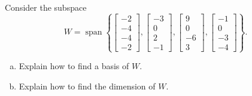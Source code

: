 
\begin{exerciseStatement}


Consider the subspace \[W=\operatorname{span}  \left\{ \left[\begin{array}{c}
-2 \\
-4 \\
-4 \\
-2
\end{array}\right] , \left[\begin{array}{c}
-3 \\
0 \\
2 \\
-1
\end{array}\right] , \left[\begin{array}{c}
9 \\
0 \\
-6 \\
3
\end{array}\right] , \left[\begin{array}{c}
-1 \\
0 \\
-3 \\
-4
\end{array}\right] \right\} .\]


\begin{enumerate}[(a)]
\item  Explain how to find a basis of \(W\).
\item  Explain how to find the dimension of \(W\).
\end{enumerate}
    
\end{exerciseStatement}
    
